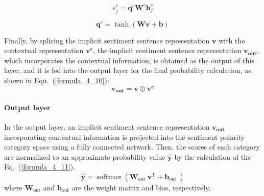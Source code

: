 \begin{equation}
    e_j^c=\boldsymbol{q}^c \boldsymbol{W}^c \boldsymbol{h}_j^c
    \label{formula_4_8}
\end{equation}

\begin{equation}
    \boldsymbol{q}^c=\tanh (\boldsymbol{W} \boldsymbol{v}+\boldsymbol{b})
    \label{formula_4_9}
\end{equation}

Finally, by splicing the implicit sentiment sentence representation $\boldsymbol{v}$ with the contextual representation $\boldsymbol{v^c}$, the implicit sentiment sentence representation $\boldsymbol{v_{out}}$, which incorporates the contextual information, is obtained as the output of this layer, and it is fed into the output layer for the final probability calculation, as shown in Equ.~(\ref{formula_4_10}):
\begin{equation}
    \boldsymbol{v_{out}}=\boldsymbol{v} \oplus \boldsymbol{v^c}
    \label{formula_4_10}
\end{equation}

\paragraph{Output layer}

In the output layer, an implicit sentiment sentence representation $\boldsymbol{v_{out}}$ incorporating contextual information is projected into the sentiment polarity category space using a fully connected network. Then, the scores of each category are normalized to an approximate probability value $\widehat{\boldsymbol{y}}$ by the calculation of the Eq.~(\ref{formula_4_11}).
\begin{equation}
    \widehat{\boldsymbol{y}}=\operatorname{softmax}\left(\boldsymbol{W}_{\text {out }} \boldsymbol{v}^{\mathrm{T}}+\boldsymbol{b}_{\text {out }}\right)
    \label{formula_4_11}
\end{equation}
where $\boldsymbol{W}_{\text{out}}$ and $\boldsymbol{b}_{\text{out}}$ are the weight matrix and bias, respectively.
